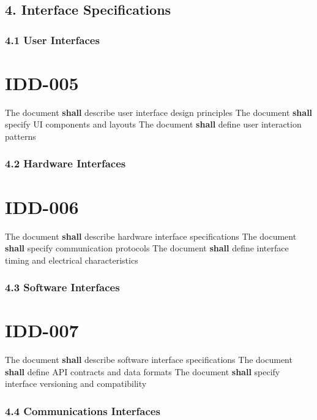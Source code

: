 \subsection{4. Interface Specifications}

\subsubsection{4.1 User Interfaces}

\section{IDD-005}\label{IDD-005}

The document \textbf{shall} describe user interface design principles
The document \textbf{shall} specify UI components and layouts
The document \textbf{shall} define user interaction patterns

\subsubsection{4.2 Hardware Interfaces}

\section{IDD-006}\label{IDD-006}

The document \textbf{shall} describe hardware interface specifications
The document \textbf{shall} specify communication protocols
The document \textbf{shall} define interface timing and electrical characteristics

\subsubsection{4.3 Software Interfaces}

\section{IDD-007}\label{IDD-007}

The document \textbf{shall} describe software interface specifications
The document \textbf{shall} define API contracts and data formats
The document \textbf{shall} specify interface versioning and compatibility

\subsubsection{4.4 Communications Interfaces}

